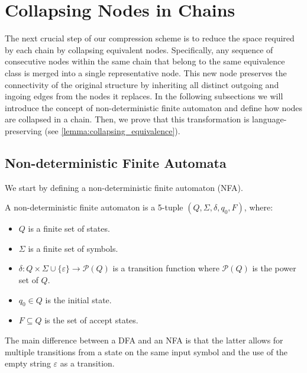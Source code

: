 \section{Collapsing Nodes in Chains} \label{sec:collapsing}
The next crucial step of our compression scheme is to reduce the space required by each chain by collapsing equivalent nodes. Specifically, any sequence of consecutive nodes within the same chain that belong to the same equivalence class is merged into a single representative node. This new node preserves the connectivity of the original structure by inheriting all distinct outgoing and ingoing edges from the nodes it replaces. In the following subsections we will introduce the concept of non-deterministic finite automaton and define how nodes are collapsed in a chain. Then, we prove that this transformation is language-preserving (see \cref{lemma:collapsing_equivalence}).

\subsection{Non-deterministic Finite Automata}
We start by defining a non-deterministic finite automaton (NFA).  
\begin{definition}
    A non-deterministic finite automaton is a 5-tuple $(Q, \Sigma, \delta, q_0, F)$, where:
    \begin{itemize}[leftmargin=25pt]
        \item $Q$ is a finite set of states.
        \item $\Sigma$ is a finite set of symbols.
        \item $\delta: Q \times \Sigma \cup \{\varepsilon\} \to \mathcal{P}(Q)$ is a transition function where $\mathcal{P}(Q)$ is the power set of $Q$.
        \item $q_0 \in Q$ is the initial state.
        \item $F \subseteq Q$ is the set of accept states.
    \end{itemize}
\end{definition}
The main difference between a DFA and an NFA is that the latter allows for multiple transitions from a state on the same input symbol and the use of the empty string $\varepsilon$ as a transition.

